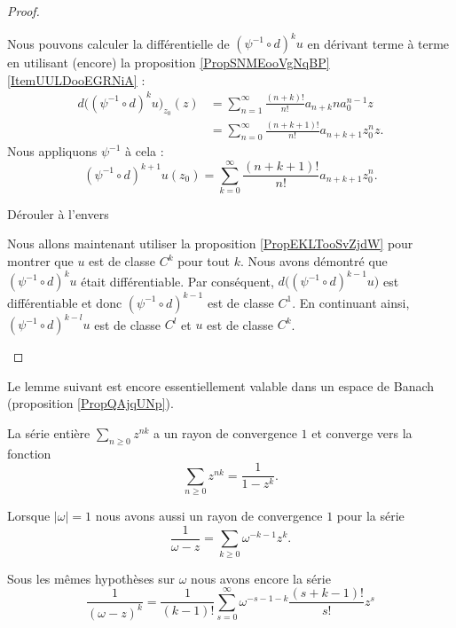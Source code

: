 \begin{proof}
\begin{subproof}
        Nous pouvons calculer la différentielle de \( (\psi^{-1}\circ d)^ku\) en dérivant terme à terme en utilisant (encore) la proposition \ref{PropSNMEooVgNqBP}\ref{ItemUULDooEGRNiA} :
        \begin{subequations}
            \begin{align}
                d\big( (\psi^{-1}\circ d)^k u\big)_{z_0}(z)&=\sum_{n=1}^{\infty}\frac{ (n+k)! }{ n! }a_{n+k}na_{0}^{n-1}z\\
                &=\sum_{n=0}^{\infty}\frac{ (n+k+1)! }{ n! }a_{n+k+1}z_{0}^nz.
            \end{align}
        \end{subequations}
        Nous appliquons \( \psi^{-1}\) à cela :
        \begin{equation}
            (\psi^{-1}\circ d)^{k+1}u(z_0)=\sum_{k=0}^{\infty}\frac{ (n+k+1)! }{ n! }a_{n+k+1}z_0^n.
        \end{equation}
        
    \item[Dérouler à l'envers]

        Nous allons maintenant utiliser la proposition \ref{PropEKLTooSvZjdW} pour montrer que \( u\) est de classe \( C^k\) pour tout \( k\). Nous avons démontré que \( (\psi^{-1}\circ d)^ku\) était différentiable. Par conséquent, \( d\big( (\psi^{-1}\circ d)^{k-1}u \big)\) est différentiable et donc \( (\psi^{-1}\circ d)^{k-1}\) est de classe \( C^1\). En continuant ainsi, \( (\psi^{-1}\circ d)^{k-l}u\) est de classe \( C^l\) et \( u\) est de classe \( C^k\).
    \end{subproof}
\end{proof}

Le lemme suivant est encore essentiellement valable dans un espace de Banach (proposition \ref{PropQAjqUNp}).
\begin{lemma}       \label{LemPQFDooGUPBvF}
    La série entière \( \sum_{n\geq 0}z^{nk}\) a un rayon de convergence \( 1\) et converge vers la fonction
    \begin{equation}
        \sum_{n\geq 0}z^{nk}=\frac{1}{ 1-z^k }.
    \end{equation}

    Lorsque \( | \omega |=1\) nous avons aussi un rayon de convergence \( 1\) pour la série
    \begin{equation}        \label{EqSSHZooLwCBAZ}
        \frac{1}{ \omega-z }=\sum_{k\geq 0}\omega^{-k-1}z^k.
    \end{equation}

    Sous les mêmes hypothèses sur \( \omega\) nous avons encore la série
    \begin{equation}
        \frac{1}{ (\omega-z)^k }=\frac{1}{ (k-1)! }\sum_{s=0}^{\infty}\omega^{-s-1-k}\frac{ (s+k-1)! }{ s! }z^s
    \end{equation}
    
\end{lemma}

